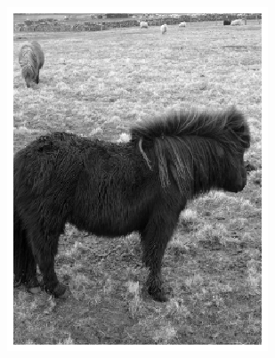 \documentclass{l4proj}
\begin{document}
\begin{figure}[ht]
  \centering
  \begin{subfigure}[h!]{0.25\textwidth}
    \includegraphics[width=\textwidth]{images/unet/pony_grayscale.png}

\end{subfigure}
\end{figure}
\end{document}
